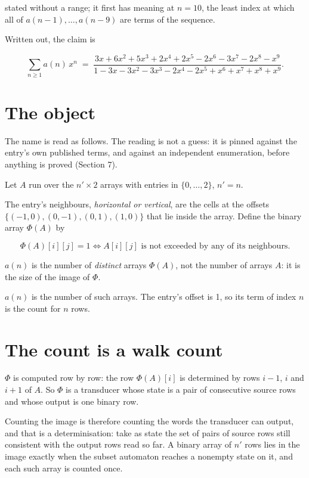 \documentclass[11pt]{article}
\theoremstyle{definition}
\begin{document}
stated without a range; it first has meaning at $n = 10$, the least index at which all of $a(n-1),\dots,a(n-9)$ are terms of the sequence.

Written out, the claim is

\[\sum_{n \ge 1} a(n)\,x^n \;=\; \frac{3x + 6x^{2} + 5x^{3} + 2x^{4} + 2x^{5} - 2x^{6} - 3x^{7} - 2x^{8} - x^{9}}{1 - 3x - 3x^{2} - 3x^{3} - 2x^{4} - 2x^{5} + x^{6} + x^{7} + x^{8} + x^{9}}.\]

\section{The object}

The name is read as follows. The reading is not a guess: it is pinned against the entry's own published terms, and against an independent enumeration, before anything is proved (Section 7).

Let $A$ run over the $n' \times 2$ arrays with entries in $\{0,\dots,2\}$, $n' = n$.

The entry's neighbours, {\itshape horizontal or vertical}, are the cells at the offsets $\{(-1,0), (0,-1), (0,1), (1,0)\}$ that lie inside the array. Define the binary array $\Phi(A)$ by

\[\Phi(A)[i][j] = 1 \iff A[i][j] \text{ is not exceeded by any of its neighbours}.\]

$a(n)$ is the number of {\itshape distinct} arrays $\Phi(A)$, not the number of arrays $A$: it is the size of the image of $\Phi$.

$a(n)$ is the number of such arrays. The entry's offset is 1, so its term of index $n$ is the count for $n$ rows.

\section{The count is a walk count}

$\Phi$ is computed row by row: the row $\Phi(A)[i]$ is determined by rows $i-1$, $i$ and $i+1$ of $A$. So $\Phi$ is a transducer whose state is a pair of consecutive source rows and whose output is one binary row.

Counting the image is therefore counting the words the transducer can output, and that is a determinisation: take as state the set of pairs of source rows still consistent with the output rows read so far. A binary array of $n'$ rows lies in the image exactly when the subset automaton reaches a nonempty state on it, and each such array is counted once.
\end{document}
